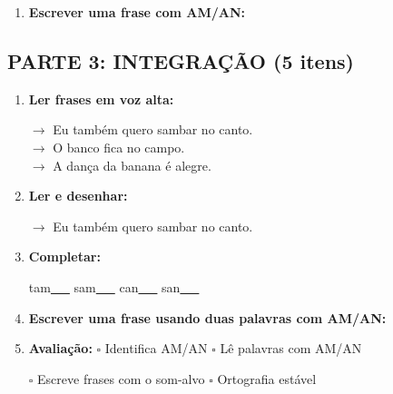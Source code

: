 \begin{exercicio}
\begin{enumerate}[resume]
  \item \textbf{Escrever uma frase com AM/AN:}
  \begin{center}
  \underline{\hspace{12cm}}
  \end{center}

\end{enumerate}

\subsection*{PARTE 3: INTEGRAÇÃO (5 itens)}

\begin{enumerate}[resume]

  \item \textbf{Ler frases em voz alta:}
  \begin{center}
  $\rightarrow$ Eu também quero sambar no canto.\\
  $\rightarrow$ O banco fica no campo.\\
  $\rightarrow$ A dança da banana é alegre.\\
  \end{center}

  \item \textbf{Ler e desenhar:}
  \begin{center}
  $\rightarrow$ Eu também quero sambar no canto.
  \end{center}
  \begin{center}
  \end{center}

  \item \textbf{Completar:}
  \begin{center}
  tam\underline{~~~} \quad sam\underline{~~~} \quad can\underline{~~~} \quad san\underline{~~~}
  \end{center}

  \item \textbf{Escrever uma frase usando duas palavras com AM/AN:}
  \begin{center}
  \underline{\hspace{12cm}}
  \end{center}

  \item \textbf{Avaliação:} $\square$ Identifica AM/AN \quad $\square$ Lê palavras com AM/AN
  \begin{center}
  $\square$ Escreve frases com o som-alvo \quad $\square$ Ortografia estável
  \end{center}


\end{enumerate}
\end{exercicio}
